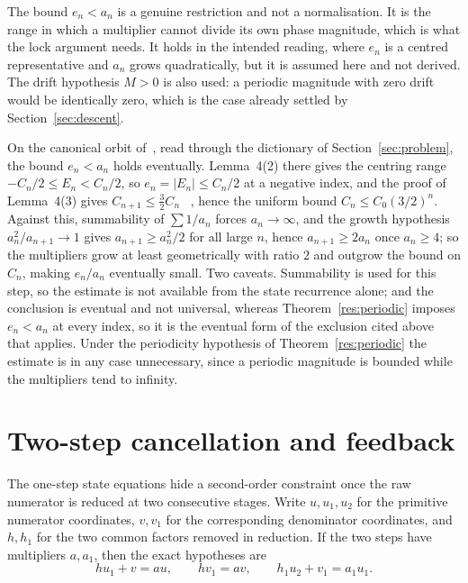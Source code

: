 \documentclass[11pt]{article}
\begin{document}
The bound $e_n<a_n$ is a genuine restriction and not a normalisation.  It is
the range in which a multiplier cannot divide its own phase magnitude, which
is what the lock argument needs.  It holds in the intended reading, where
$e_n$ is a centred representative and $a_n$ grows quadratically, but it is
assumed here and not derived.  The drift hypothesis $M>0$ is also used: a
periodic magnitude with zero drift would be identically zero, which is the case
already settled by Section~\ref{sec:descent}.

\begin{remark}
On the canonical orbit of~\cite{koizumi2025}, read through the dictionary of
Section~\ref{sec:problem}, the bound $e_n<a_n$ holds eventually.  Lemma~4(2)
there gives the centring range $-C_n/2\le E_n<C_n/2$, so $e_n=|E_n|\le C_n/2$ at
a negative index, and the proof of Lemma~4(3) gives $C_{n+1}\le\tfrac32C_n$
~\cite[p.~11]{koizumi2025},
hence the uniform bound $C_n\le C_0(3/2)^{n}$.  Against this, summability of
$\sum1/a_n$ forces
$a_n\to\infty$, and the growth hypothesis $a_n^{2}/a_{n+1}\to1$ gives
$a_{n+1}\ge a_n^{2}/2$ for all large $n$, hence $a_{n+1}\ge2a_n$ once
$a_n\ge4$; so the multipliers grow at least geometrically with ratio $2$ and
outgrow the bound on $C_n$, making $e_n/a_n$ eventually small.  Two caveats.
Summability is used for this step, so the estimate is not available from the
state recurrence alone; and the conclusion is eventual and not universal,
whereas Theorem~\ref{res:periodic} imposes $e_n<a_n$ at every index, so it is
the eventual form of the exclusion cited above that applies.  Under the
periodicity hypothesis of Theorem~\ref{res:periodic} the estimate is in any
case unnecessary, since a periodic magnitude is bounded while the multipliers
tend to infinity.
\end{remark}


\section{Two-step cancellation and feedback}\label{app:feedback}

The one-step state equations hide a second-order constraint once the raw
numerator is reduced at two consecutive stages.  Write $u,u_1,u_2$ for the
primitive numerator coordinates, $v,v_1$ for the corresponding denominator
coordinates, and $h,h_1$ for the two common factors removed in reduction.  If
the two steps have multipliers $a,a_1$, then the exact hypotheses are
\[
 hu_1+v=au,\qquad hv_1=av,\qquad
 h_1u_2+v_1=a_1u_1.
\]
\end{document}
